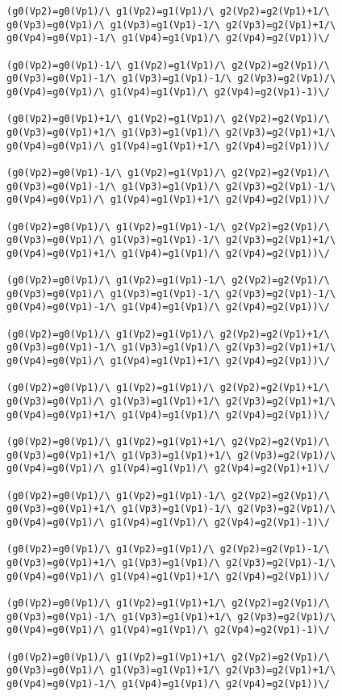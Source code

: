\begin{appendices}
\begin{lstlisting}
(g0(Vp2)=g0(Vp1)/\ g1(Vp2)=g1(Vp1)/\ g2(Vp2)=g2(Vp1)+1/\ g0(Vp3)=g0(Vp1)/\ g1(Vp3)=g1(Vp1)-1/\ g2(Vp3)=g2(Vp1)+1/\ g0(Vp4)=g0(Vp1)-1/\ g1(Vp4)=g1(Vp1)/\ g2(Vp4)=g2(Vp1))\/ 

(g0(Vp2)=g0(Vp1)-1/\ g1(Vp2)=g1(Vp1)/\ g2(Vp2)=g2(Vp1)/\ g0(Vp3)=g0(Vp1)-1/\ g1(Vp3)=g1(Vp1)-1/\ g2(Vp3)=g2(Vp1)/\ g0(Vp4)=g0(Vp1)/\ g1(Vp4)=g1(Vp1)/\ g2(Vp4)=g2(Vp1)-1)\/ 

(g0(Vp2)=g0(Vp1)+1/\ g1(Vp2)=g1(Vp1)/\ g2(Vp2)=g2(Vp1)/\ g0(Vp3)=g0(Vp1)+1/\ g1(Vp3)=g1(Vp1)/\ g2(Vp3)=g2(Vp1)+1/\ g0(Vp4)=g0(Vp1)/\ g1(Vp4)=g1(Vp1)+1/\ g2(Vp4)=g2(Vp1))\/ 

(g0(Vp2)=g0(Vp1)-1/\ g1(Vp2)=g1(Vp1)/\ g2(Vp2)=g2(Vp1)/\ g0(Vp3)=g0(Vp1)-1/\ g1(Vp3)=g1(Vp1)/\ g2(Vp3)=g2(Vp1)-1/\ g0(Vp4)=g0(Vp1)/\ g1(Vp4)=g1(Vp1)+1/\ g2(Vp4)=g2(Vp1))\/ 

(g0(Vp2)=g0(Vp1)/\ g1(Vp2)=g1(Vp1)-1/\ g2(Vp2)=g2(Vp1)/\ g0(Vp3)=g0(Vp1)/\ g1(Vp3)=g1(Vp1)-1/\ g2(Vp3)=g2(Vp1)+1/\ g0(Vp4)=g0(Vp1)+1/\ g1(Vp4)=g1(Vp1)/\ g2(Vp4)=g2(Vp1))\/ 

(g0(Vp2)=g0(Vp1)/\ g1(Vp2)=g1(Vp1)-1/\ g2(Vp2)=g2(Vp1)/\ g0(Vp3)=g0(Vp1)/\ g1(Vp3)=g1(Vp1)-1/\ g2(Vp3)=g2(Vp1)-1/\ g0(Vp4)=g0(Vp1)-1/\ g1(Vp4)=g1(Vp1)/\ g2(Vp4)=g2(Vp1))\/ 

(g0(Vp2)=g0(Vp1)/\ g1(Vp2)=g1(Vp1)/\ g2(Vp2)=g2(Vp1)+1/\ g0(Vp3)=g0(Vp1)-1/\ g1(Vp3)=g1(Vp1)/\ g2(Vp3)=g2(Vp1)+1/\ g0(Vp4)=g0(Vp1)/\ g1(Vp4)=g1(Vp1)+1/\ g2(Vp4)=g2(Vp1))\/ 

(g0(Vp2)=g0(Vp1)/\ g1(Vp2)=g1(Vp1)/\ g2(Vp2)=g2(Vp1)+1/\ g0(Vp3)=g0(Vp1)/\ g1(Vp3)=g1(Vp1)+1/\ g2(Vp3)=g2(Vp1)+1/\ g0(Vp4)=g0(Vp1)+1/\ g1(Vp4)=g1(Vp1)/\ g2(Vp4)=g2(Vp1))\/ 

(g0(Vp2)=g0(Vp1)/\ g1(Vp2)=g1(Vp1)+1/\ g2(Vp2)=g2(Vp1)/\ g0(Vp3)=g0(Vp1)+1/\ g1(Vp3)=g1(Vp1)+1/\ g2(Vp3)=g2(Vp1)/\ g0(Vp4)=g0(Vp1)/\ g1(Vp4)=g1(Vp1)/\ g2(Vp4)=g2(Vp1)+1)\/ 

(g0(Vp2)=g0(Vp1)/\ g1(Vp2)=g1(Vp1)-1/\ g2(Vp2)=g2(Vp1)/\ g0(Vp3)=g0(Vp1)+1/\ g1(Vp3)=g1(Vp1)-1/\ g2(Vp3)=g2(Vp1)/\ g0(Vp4)=g0(Vp1)/\ g1(Vp4)=g1(Vp1)/\ g2(Vp4)=g2(Vp1)-1)\/ 

(g0(Vp2)=g0(Vp1)/\ g1(Vp2)=g1(Vp1)/\ g2(Vp2)=g2(Vp1)-1/\ g0(Vp3)=g0(Vp1)+1/\ g1(Vp3)=g1(Vp1)/\ g2(Vp3)=g2(Vp1)-1/\ g0(Vp4)=g0(Vp1)/\ g1(Vp4)=g1(Vp1)+1/\ g2(Vp4)=g2(Vp1))\/ 

(g0(Vp2)=g0(Vp1)/\ g1(Vp2)=g1(Vp1)+1/\ g2(Vp2)=g2(Vp1)/\ g0(Vp3)=g0(Vp1)-1/\ g1(Vp3)=g1(Vp1)+1/\ g2(Vp3)=g2(Vp1)/\ g0(Vp4)=g0(Vp1)/\ g1(Vp4)=g1(Vp1)/\ g2(Vp4)=g2(Vp1)-1)\/ 

(g0(Vp2)=g0(Vp1)/\ g1(Vp2)=g1(Vp1)+1/\ g2(Vp2)=g2(Vp1)/\ g0(Vp3)=g0(Vp1)/\ g1(Vp3)=g1(Vp1)+1/\ g2(Vp3)=g2(Vp1)+1/\ g0(Vp4)=g0(Vp1)-1/\ g1(Vp4)=g1(Vp1)/\ g2(Vp4)=g2(Vp1))\/ 


\end{lstlisting}
\end{appendices}
